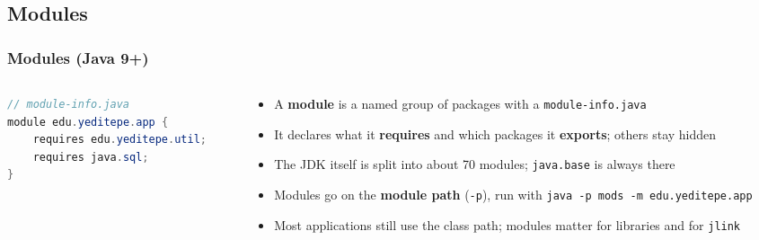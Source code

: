 \documentclass[aspectratio=169,10pt,compress]{beamer}
\begin{document}
\subsection[Modules]{Modules}




\begin{frame}[t,fragile] \frametitle{Modules (Java 9+)}
  \begin{columns}[T]
    \begin{column}{0.46\textwidth}


\begin{lstlisting}[style=codesnippet, language=Java]
// module-info.java
module edu.yeditepe.app {
    requires edu.yeditepe.util;
    requires java.sql;
}
\end{lstlisting}


      \begin{center}
      \end{center}
    \end{column}
    \begin{column}{0.5\textwidth}
      \begin{itemize}\small
        \item A \textbf{module} is a named group of packages with a \texttt{module-info.java}
        \item It declares what it \textbf{requires} and which packages it \textbf{exports}; others stay hidden
        \item The JDK itself is split into about 70 modules; \texttt{java.base} is always there
        \item Modules go on the \textbf{module path} (\texttt{-p}), run with \texttt{java -p mods -m edu.yeditepe.app}
        \item Most applications still use the class path; modules matter for libraries and for \texttt{jlink}
      \end{itemize}
    \end{column}
  \end{columns}
\end{frame}
\end{document}
